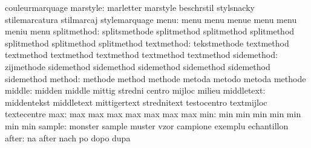                           couleurmarquage
                 marstyle: marletter                 marstyle
                           beschrstil                stylsnacky
                           stilemarcatura            stilmarcaj
                           stylemarquage
                     menu: menu                      menu
                           menue                     menu
                           menu                      meniu
                           menu
              splitmethod: splitsmethode             splitmethod
                           splitmethod               splitmethod
                           splitmethod               splitmethod
                           splitmethod
               textmethod: tekstmethode              textmethod
                           textmethod                textmethod
                           textmethod                textmethod
                           textmethod
               sidemethod: zijmethode                sidemethod
                           sidemethod                sidemethod
                           sidemethod                sidemethod
                           sidemethod
                   method: methode                   method
                           methode                   metoda
                           metodo                    metoda
                           methode
                   middle: midden                    middle
                           mittig                    stredni
                           centro                    mijloc
                           milieu
               middletext: middentekst               middletext
                           mittigertext              strednitext
                           testocentro               textmijloc
                           textecentre
                      max: max                       max
                           max                       max
                           max                       max
                           max
                      min: min                       min
                           min                       min
                           min                       min
                           min
                   sample: monster                   sample
                           muster                    vzor
                           campione                  exemplu
                           echantillon
                    after: na                        after
                           nach                      po
                           dopo                      dupa
